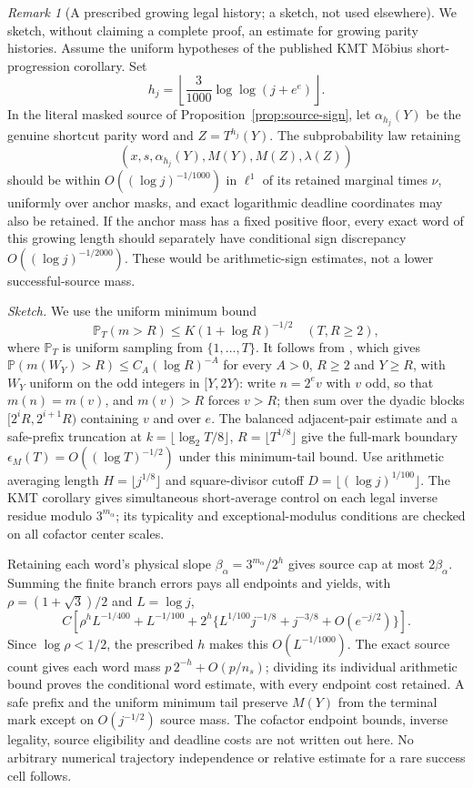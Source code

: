 \documentclass[11pt]{amsart}
\theoremstyle{definition}
\theoremstyle{remark}
\newtheorem{remark}[theorem]{Remark}
\newcommand{\PP}{\mathbb P}
\begin{document}
\begin{remark}[A prescribed growing legal history; a sketch, not used elsewhere]\label{prop:growing-history-sign}
We sketch, without claiming a complete proof, an estimate for growing parity histories. Assume the uniform hypotheses of the published KMT M\"obius short-progression corollary. Set
\[
 h_j=\left\lfloor\frac3{1000}\log\log(j+e^e)\right\rfloor.
\]
In the literal masked source of Proposition~\ref{prop:source-sign}, let $\alpha_{h_j}(Y)$ be the genuine shortcut parity word and $Z=T^{h_j}(Y)$. The subprobability law retaining
\[
 (x,s,\alpha_{h_j}(Y),M(Y),M(Z),\lambda(Z))
\]
should be within $O((\log j)^{-1/1000})$ in $\ell^1$ of its retained marginal times $\nu$, uniformly over anchor masks, and exact logarithmic deadline coordinates may also be retained. If the anchor mass has a fixed positive floor, every exact word of this growing length should separately have conditional sign discrepancy $O((\log j)^{-1/2000})$. These would be arithmetic-sign estimates, not a lower successful-source mass.

\emph{Sketch.} We use the uniform minimum bound
\[
 \PP_T(m>R)\le K(1+\log R)^{-1/2}\quad(T,R\ge2),
\]
where $\PP_T$ is uniform sampling from $\{1,\ldots,T\}$. It follows from \cite[Corollary~10.2]{BM}, which gives $\PP(m(W_Y)>R)\le C_A(\log R)^{-A}$ for every $A>0$, $R\ge2$ and $Y\ge R$, with $W_Y$ uniform on the odd integers in $[Y,2Y)$: write $n=2^ev$ with $v$ odd, so that $m(n)=m(v)$, and $m(v)>R$ forces $v>R$; then sum over the dyadic blocks $[2^iR,2^{i+1}R)$ containing $v$ and over $e$.
The balanced adjacent-pair estimate and a safe-prefix truncation at $k=\lfloor\log_2 T/8\rfloor$, $R=\lfloor T^{1/8}\rfloor$ give the full-mark boundary $\epsilon_M(T)=O((\log T)^{-1/2})$ under this minimum-tail bound. Use arithmetic averaging length $H=\lfloor j^{1/8}\rfloor$ and square-divisor cutoff $D=\lfloor(\log j)^{1/100}\rfloor$. The KMT corollary gives simultaneous short-average control on each legal inverse residue modulo $3^{m_\alpha}$; its typicality and exceptional-modulus conditions are checked on all cofactor center scales.

Retaining each word's physical slope $\beta_\alpha=3^{m_\alpha}/2^h$ gives source cap at most $2\beta_\alpha$. Summing the finite branch errors pays all endpoints and yields, with $\rho=(1+\sqrt3)/2$ and $L=\log j$,
\[
 C\left[\rho^h L^{-1/400}+L^{-1/100}
       +2^h\{L^{1/100}j^{-1/8}+j^{-3/8}+O(e^{-j/2})\}\right].
\]
Since $\log\rho<1/2$, the prescribed $h$ makes this $O(L^{-1/1000})$. The exact source count gives each word mass $p\,2^{-h}+O(p/n_s)$; dividing its individual arithmetic bound proves the conditional word estimate, with every endpoint cost retained. A safe prefix and the uniform minimum tail preserve $M(Y)$ from the terminal mark except on $O(j^{-1/2})$ source mass. The cofactor endpoint bounds, inverse legality, source eligibility and deadline costs are not written out here. No arbitrary numerical trajectory independence or relative estimate for a rare success cell follows.
\end{remark}
\end{document}
